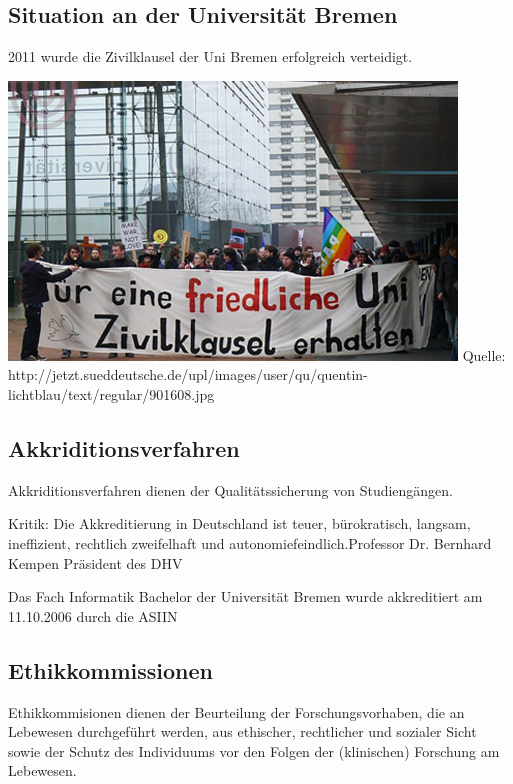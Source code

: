 \subsection*{Situation an der Universität Bremen}
\begin{frame}
2011 wurde die Zivilklausel der Uni Bremen erfolgreich verteidigt.


\includegraphics[scale=0.5]{images/zivilklausel.jpg}
{\tiny{Quelle: http://jetzt.sueddeutsche.de/upl/images/user/qu/quentin-lichtblau/text/regular/901608.jpg}}

\end{frame}

\subsection*{Akkriditionsverfahren}
\begin{frame}
Akkriditionsverfahren dienen der Qualitätssicherung von Studiengängen.
\end{frame}

\begin{frame}
Kritik:
\glqq Die Akkreditierung in Deutschland ist teuer, bürokratisch, langsam, ineffizient, rechtlich zweifelhaft und autonomiefeindlich.\grqq Professor Dr. Bernhard Kempen Präsident des DHV
\end{frame}

\begin{frame}
Das Fach Informatik Bachelor der Universität Bremen wurde  
akkreditiert am 11.10.2006 durch die ASIIN
\end{frame}

\subsection*{Ethikkommissionen}
\begin{frame}
Ethikkommisionen dienen der Beurteilung der Forschungsvorhaben, die an Lebewesen durchgeführt werden, aus ethischer, rechtlicher und sozialer Sicht sowie der Schutz des Individuums vor den Folgen der (klinischen) Forschung am Lebewesen.

\end{frame}

